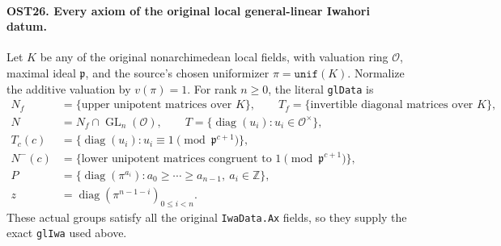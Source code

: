 \documentclass[11pt,a4paper]{article}
\numberwithin{equation}{section}
\theoremstyle{remark}\newtheorem{remark}[theorem]{Remark}
\begin{document}
\paragraph{OST26. Every axiom of the original local general-linear Iwahori datum.}
\label{claim:OST26}
Let $K$ be any of the original nonarchimedean local fields, with
valuation ring $\mathcal O$, maximal ideal $\mathfrak p$, and the
source's chosen uniformizer $\pi=\texttt{unif}(K)$.  Normalize the
additive valuation by $v(\pi)=1$.  For rank $n\geq0$, the literal
\texttt{gl\allowbreak Data} is
\begin{align*}
 N_f&=\{\text{upper unipotent matrices over }K\},\qquad
 T_f=\{\text{invertible diagonal matrices over }K\},\\
 N&=N_f\cap\operatorname{GL}_n(\mathcal O),\qquad
 T=\{\operatorname{diag}(u_i):u_i\in\mathcal O^\times\},\\
 T_c(c)&=\{\operatorname{diag}(u_i):u_i\equiv1
                                  \pmod{\mathfrak p^{c+1}}\},\\
 N^-(c)&=\{\text{lower unipotent matrices congruent to }1
                                  \pmod{\mathfrak p^{c+1}}\},\\
 P&=\{\operatorname{diag}(\pi^{a_i}):a_0\geq\cdots\geq a_{n-1},
                                      \ a_i\in\mathbb Z\},\\
 z&=\operatorname{diag}(\pi^{n-1-i})_{0\leq i<n}.
\end{align*}
These actual groups satisfy all the original \texttt{Iwa\allowbreak Data.\allowbreak Ax}
fields, so they supply the exact \texttt{gl\allowbreak Iwa} used above.
\end{document}
